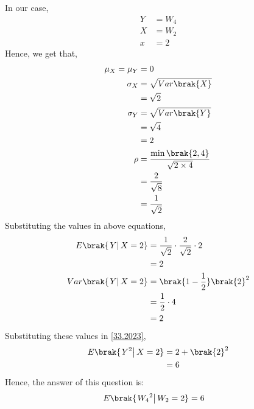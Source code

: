\documentclass[journal,12pt,twocolumn]{IEEEtran}
\theoremstyle{remark}
\begin{document}
In our case, 
\begin{align}
Y &= W_4\\
X &= W_2\\
x &= 2
\end{align}
Hence, we get that,
\begin{align}
\mu_X = \mu_Y &= 0\\ 
\sigma_X &= \sqrt{Var\brak{X}}\\
	 &= \sqrt{2}\\
\sigma_Y &= \sqrt{Var\brak{Y}}\\
	 &= \sqrt{4}\\
	 &= 2\\
\rho &= \frac{\min\brak{2,4}}{\sqrt{2\times 4}}\\
     &= \frac{2}{\sqrt{8}}\\
     &= \frac{1}{\sqrt{2}}
\end{align} 
Substituting the values in above equations,
\begin{align}
E\brak{\left.Y\right | X=2} &= \frac{1}{\sqrt{2}}\cdot\frac{2}{\sqrt{2}}\cdot 2\\
			    &= 2\\
Var\brak{\left.Y\right | X=2} &= \brak{1 - \frac{1}{2}}\brak{2}^2\\
			      &= \frac{1}{2}\cdot 4\\
			      &= 2\\
\end{align}
Substituting these values in \eqref{33.2023},
\begin{align}
E\brak{\left.Y^2\right | X=2} &= 2 + \brak{2}^2\\
			      &= 6
\end{align}
Hence, the answer of this question is:
\begin{align}
E\brak{\left.{W_4}^2\right | W_2=2} &= 6
\end{align}
\end{document}
